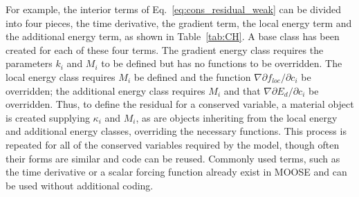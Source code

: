 \documentclass[letter,12pt,fleqn]{article}
\begin{document}
For example, the interior terms of Eq.~\eqref{eq:cons_residual_weak} can be divided into four pieces, the time derivative, the gradient term, the local energy term and the additional energy term, as shown in Table~\ref{tab:CH}.  A base class has been created for each of these four terms.  The gradient energy class requires the parameters $k_i$ and $M_i$ to be defined but has no functions to be overridden.  The local energy class requires $M_i$ be defined and the function $\nabla \partial f_{loc} / \partial c_i$ be overridden; the additional energy class requires $M_i$ and that $\nabla  \partial E_d / \partial c_i$ be overridden.  Thus, to define the residual for a conserved variable, a material object is created supplying $\kappa_i$ and $M_i$, as are objects inheriting from the local energy and additional energy classes, overriding the necessary functions. This process is repeated for all of the conserved variables required by the model, though often their forms are similar and code can be reused.  Commonly used terms, such as the time derivative or a scalar forcing function already exist in MOOSE and can be used without additional coding. 
\end{document}
